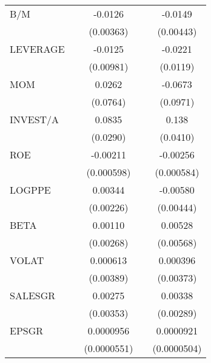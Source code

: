 \begin{table}[htbp]
\begin{tabular}{l*{4}{c}}
B/M             &                  &  -0.0126\sym{***}&                  &  -0.0149\sym{***}\\
                &                  &(0.00363)         &                  &(0.00443)         \\
LEVERAGE        &                  &  -0.0125         &                  &  -0.0221\sym{*}  \\
                &                  &(0.00981)         &                  & (0.0119)         \\
MOM             &                  &   0.0262         &                  &  -0.0673         \\
                &                  & (0.0764)         &                  & (0.0971)         \\
INVEST/A        &                  &   0.0835\sym{***}&                  &    0.138\sym{***}\\
                &                  & (0.0290)         &                  & (0.0410)         \\
ROE             &                  & -0.00211\sym{***}&                  & -0.00256\sym{***}\\
                &                  &(0.000598)         &                  &(0.000584)         \\
LOGPPE          &                  &  0.00344         &                  & -0.00580         \\
                &                  &(0.00226)         &                  &(0.00444)         \\
BETA            &                  &  0.00110         &                  &  0.00528         \\
                &                  &(0.00268)         &                  &(0.00568)         \\
VOLAT           &                  & 0.000613         &                  & 0.000396         \\
                &                  &(0.00389)         &                  &(0.00373)         \\
SALESGR         &                  &  0.00275         &                  &  0.00338         \\
                &                  &(0.00353)         &                  &(0.00289)         \\
EPSGR           &                  &0.0000956\sym{*}  &                  &0.0000921\sym{*}  \\
                &                  &(0.0000551)         &                  &(0.0000504)         \\

\end{tabular}
\end{table}
